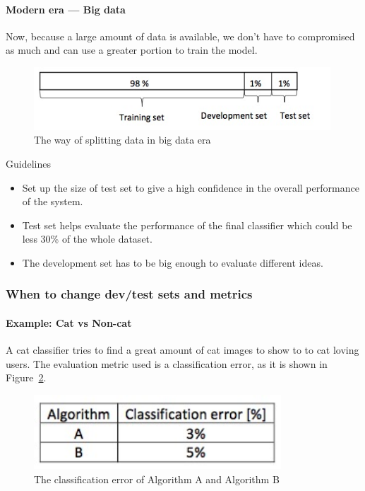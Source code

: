 \documentclass[UTF8]{article}
\begin{document}
\paragraph{Modern era --- Big data}
Now, because a large amount of data is available, we don't have to compromised as much and can use
a greater portion to train the model.

\begin{figure}[htb]
    \centering
    \includegraphics[width=30em]{figures/modern-era-splitting-data}
    \caption{The way of splitting data in big data era}
    \label{fig:modern-era-splitting-data}
\end{figure}

Guidelines
\begin{itemize}
    \item Set up the size of test set to give a high confidence in the overall performance of the
    system.
    \item Test set helps evaluate the performance of the final classifier which could be less 30\%
    of the whole dataset.
    \item The development set has to be big enough to evaluate different ideas.
\end{itemize}

\subsubsection{When to change dev/test sets and metrics}
\paragraph{Example: Cat vs Non-cat}
A cat classifier tries to find a great amount of cat images to show to to cat loving users. The
evaluation metric used is a classification error, as it is shown in
Figure~\ref{fig:classification-error}.

\begin{figure}[htb]
    \centering
    \includegraphics[width=25em]{figures/classification-error}
    \caption{The classification error of Algorithm A and Algorithm B}
    \label{fig:classification-error}
\end{figure}
\end{document}
